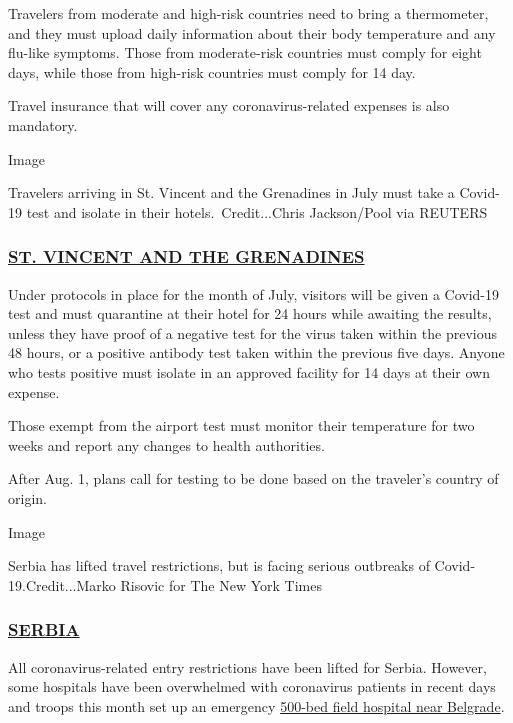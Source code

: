 Travelers from moderate and high-risk countries need to bring a
thermometer, and they must upload daily information about their body
temperature and any flu-like symptoms. Those from moderate-risk
countries must comply for eight days, while those from high-risk
countries must comply for 14 day.

Travel insurance that will cover any coronavirus-related expenses is
also mandatory.

Image

Travelers arriving in St. Vincent and the Grenadines in July must take a
Covid-19 test and isolate in their hotels.~Credit...Chris Jackson/Pool
via REUTERS

\hypertarget{st-vincent-and-the-grenadines}{%
\subsubsection{\texorpdfstring{\href{https://www.facebook.com/svgairports/photos/pcb.934154330347186/934153757013910/}{ST.
VINCENT AND THE
GRENADINES}}{ST. VINCENT AND THE GRENADINES}}\label{st-vincent-and-the-grenadines}}

Under protocols in place for the month of July, visitors will be given a
Covid-19 test and must quarantine at their hotel for 24 hours while
awaiting the results, unless they have proof of a negative test for the
virus taken within the previous 48 hours, or a positive antibody test
taken within the previous five days. Anyone who tests positive must
isolate in an approved facility for 14 days at their own expense.

Those exempt from the airport test must monitor their temperature for
two weeks and report any changes to health authorities.

After Aug. 1, plans call for testing to be done based on the traveler's
country of origin.

Image

Serbia has lifted travel restrictions, but is facing serious outbreaks
of Covid-19.Credit...Marko Risovic for The New York Times

\hypertarget{serbia}{%
\subsubsection{\texorpdfstring{\href{https://rs.usembassy.gov/health-and-travel-alert-3/}{SERBIA}}{SERBIA}}\label{serbia}}

All coronavirus-related entry restrictions have been lifted for Serbia.
However, some hospitals have been overwhelmed with coronavirus patients
in recent days and troops this month set up an emergency
\href{https://www.republicworld.com/world-news/europe/serbia-military-sets-up-field-hospital-for-virus.html}{500-bed
field hospital near Belgrade}.

